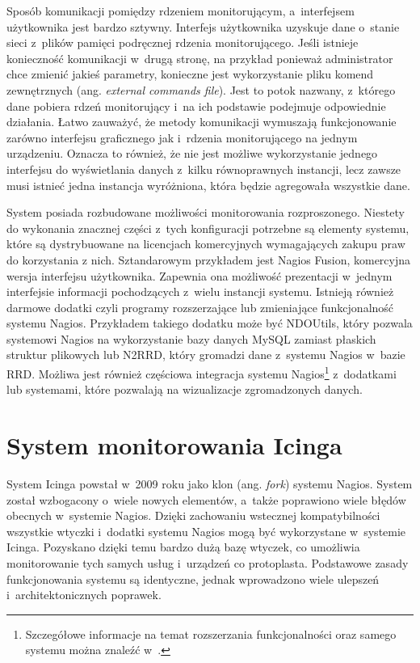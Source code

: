 Sposób komunikacji pomiędzy rdzeniem monitorującym, a~interfejsem
użytkownika jest bardzo sztywny. Interfejs użytkownika uzyskuje dane
o~stanie sieci z~plików pamięci podręcznej rdzenia
monitorującego. Jeśli istnieje konieczność komunikacji w~drugą stronę,
na przykład ponieważ administrator chce zmienić jakieś parametry,
konieczne jest wykorzystanie pliku komend zewnętrznych (ang. {\em
  external commands file}). Jest to potok nazwany, z~którego dane
pobiera rdzeń monitorujący i~na ich podstawie podejmuje odpowiednie
działania. Łatwo zauważyć, że metody komunikacji wymuszają
funkcjonowanie zarówno interfejsu graficznego jak i~rdzenia
monitorującego na jednym urządzeniu. Oznacza to również, że nie jest
możliwe wykorzystanie jednego interfejsu do wyświetlania danych
z~kilku równoprawnych instancji, lecz zawsze musi istnieć jedna
instancja wyróżniona, która będzie agregowała wszystkie dane.

System posiada rozbudowane możliwości monitorowania
rozproszonego. Niestety do wykonania znacznej części z~tych
konfiguracji potrzebne są elementy systemu, które są dystrybuowane na
licencjach komercyjnych wymagających zakupu praw do korzystania z
nich. Sztandarowym przykładem jest Nagios Fusion, komercyjna
wersja interfejsu użytkownika. Zapewnia ona możliwość prezentacji
w~jednym interfejsie informacji pochodzących z~wielu instancji
systemu. Istnieją również darmowe dodatki czyli programy rozszerzające
lub zmieniające funkcjonalność systemu Nagios. Przykładem takiego
dodatku może być NDOUtils, który pozwala systemowi Nagios na
wykorzystanie bazy danych MySQL zamiast płaskich struktur plikowych
lub N2RRD, który gromadzi dane z~systemu Nagios w~bazie RRD. Możliwa
jest również częściowa integracja systemu Nagios\footnote{Szczegółowe
  informacje na temat rozszerzania funkcjonalności oraz samego systemu
  można znaleźć w~\cite{www:Nagios}.}  z~dodatkami lub systemami,
które pozwalają na wizualizacje zgromadzonych danych.

\section[Icinga][System monitorowania Icinga]{System monitorowania Icinga}
\label{subsec:Icinga}

System Icinga powstał w~2009 roku jako klon (ang. {\em fork}) systemu
Nagios. System został wzbogacony o~wiele nowych elementów, a~także
poprawiono wiele błędów obecnych w~systemie Nagios. Dzięki zachowaniu
wstecznej kompatybilności wszystkie wtyczki i~dodatki systemu Nagios
mogą być wykorzystane w~systemie Icinga. Pozyskano dzięki temu bardzo
dużą bazę wtyczek, co umożliwia monitorowanie tych samych usług
i~urządzeń co protoplasta. Podstawowe zasady funkcjonowania systemu są
identyczne, jednak wprowadzono wiele ulepszeń i~architektonicznych
poprawek.

